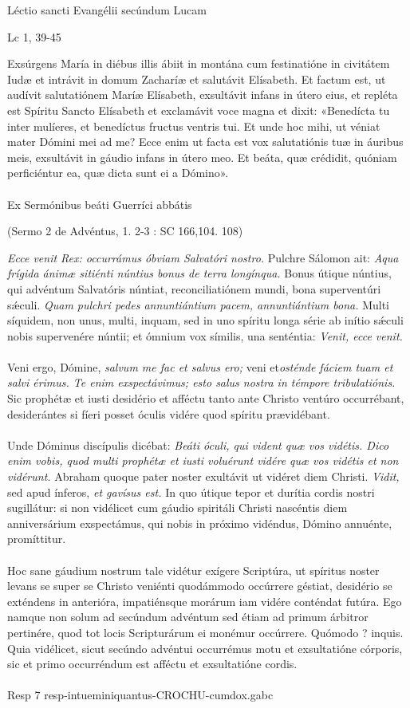 \documentclass[options]{article}
\begin{document}
	Léctio sancti Evangélii secúndum Lucam
	\begin{flushright}
		Lc 1, 39-45
	\end{flushright}
	Exsúrgens María in diébus illis ábiit in montána cum festinatióne in civitátem Iudæ et intrávit in domum Zacharíæ et salutávit Elísabeth.
	Et factum est, ut audívit salutatiónem Maríæ Elísabeth, exsultávit infans in útero eius, et repléta est Spíritu Sancto Elísabeth et exclamávit voce magna et dixit:
	«Benedícta tu inter mulíeres, et benedíctus fructus ventris tui. Et unde hoc mihi, ut véniat mater Dómini mei ad me? Ecce enim ut facta est vox salutatiónis tuæ in áuribus meis, exsultávit in gáudio infans in útero meo. Et beáta, quæ crédidit, quóniam perficiéntur ea, quæ dicta sunt ei a Dómino».\\
	\\
	Ex Sermónibus beáti Guerríci abbátis
	\begin{flushright}
		(Sermo 2 de Advéntus, 1. 2-3 : SC 166,104. 108)
	\end{flushright}
	\emph{Ecce venit Rex: occurrámus óbviam Salvatóri nostro.}
	Pulchre Sálomon ait: \emph{Aqua frígida ánimæ sitiénti núntius bonus de terra longínqua.} Bonus útique núntius, qui advéntum Salvatóris núntiat, reconciliatiónem mundi, bona superventúri s\'{æ}culi. \emph{Quam pulchri pedes annuntiántium pacem, annuntiántium bona.} Multi síquidem, non unus, multi, inquam, sed in uno spíritu longa série ab inítio s\'{æ}culi nobis supervenére núntii; et ómnium vox símilis, una senténtia: \emph{Venit, ecce venit.}\\
	\\
	Veni ergo, Dómine, \emph{salvum me fac et salvus ero;} veni et\emph{osténde fáciem tuam et salvi érimus. Te enim exspectávimus; esto salus nostra in témpore tribulatiónis.} Sic prophétæ et iusti desidério et afféctu tanto ante Christo ventúro occurrébant, desiderántes si fíeri posset óculis vidére quod spíritu prævidébant.\\
	\\
	Unde Dóminus discípulis dicébat: \emph{Beáti óculi, qui vident quæ vos vidétis. Dico enim vobis, quod multi prophétæ et iusti voluérunt vidére quæ vos vidétis et non vidérunt.} Abraham quoque pater noster exultávit ut vidéret diem Christi. \emph{Vidit,} sed apud ínferos, \emph{et gavísus est.} In quo útique tepor et durítia cordis nostri sugillátur: si non vidélicet cum gáudio spiritáli Christi nascéntis diem anniversárium exspectámus, qui nobis in próximo vidéndus, Dómino annuénte, promíttitur.\\
	\\
	Hoc sane gáudium nostrum tale vidétur exígere Scriptúra, ut spíritus noster levans se super se Christo veniénti quodámmodo occúrrere géstiat, desidério se exténdens in anterióra, impatiénsque morárum iam vidére conténdat futúra. Ego namque non solum ad secúndum advéntum sed étiam ad primum árbitror pertinére, quod tot locis Scripturárum ei monémur occúrrere. Quómodo ? inquis. Quia vidélicet, sicut secúndo advéntui occurrémus motu et exsultatióne córporis, sic et primo occurréndum est afféctu et exsultatióne cordis.\\
	\\
	Resp 7 resp-intueminiquantus-CROCHU-cumdox.gabc
\end{document}
